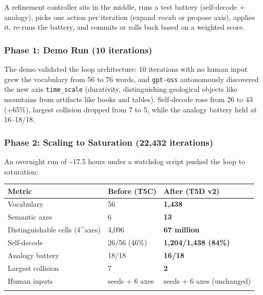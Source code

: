 \documentclass[
  twocolumn,
  10pt,
  a4paper]{article}
\newenvironment{tsxtable}{\begin{center}\footnotesize}{\end{center}}
\let\endhead\relax
\begin{document}
A refinement controller sits in the middle, runs a test battery
(self-decode + analogy), picks one action per iteration (expand vocab or
propose axis), applies it, re-runs the battery, and commits or rolls
back based on a weighted score.

\hypertarget{phase-1-demo-run-10-iterations}{%
\subsubsection{Phase 1: Demo Run (10
iterations)}\label{phase-1-demo-run-10-iterations}}

The demo validated the loop architecture: 10 iterations with no human
input grew the vocabulary from 56 to 76 words, and \texttt{gpt-oss}
autonomously discovered the new axis \texttt{time\_scale} (durativity,
distinguishing geological objects like mountains from artifacts like
books and tables). Self-decode rose from 26 to 43 (+65\%), largest
collision dropped from 7 to 5, while the analogy battery held at
16--18/18.

\hypertarget{phase-2-scaling-to-saturation-22432-iterations}{%
\subsubsection{Phase 2: Scaling to Saturation (22,432
iterations)}\label{phase-2-scaling-to-saturation-22432-iterations}}

An overnight run of \textasciitilde17.5 hours under a watchdog script
pushed the loop to saturation:

\begin{tsxtable}\begin{tabularx}{\linewidth}{@{}YYY@{}}
\toprule\noalign{}
Metric & Before (T5C) & After (T5D v2) \\
\midrule\noalign{}
\endhead
Vocabulary & 56 & \textbf{1,438} \\
Semantic axes & 6 & \textbf{13} \\
Distinguishable cells (4\^{}axes) & 4,096 & \textbf{67 million} \\
Self-decode & 26/56 (46\%) & \textbf{1,204/1,438 (84\%)} \\
Analogy battery & 18/18 & \textbf{16/18} \\
Largest collision & 7 & \textbf{2} \\
Human inputs & seeds + 6 axes & seeds + 6 axes (unchanged) \\
\bottomrule\noalign{}
\end{tabularx}\end{tsxtable}
\end{document}
